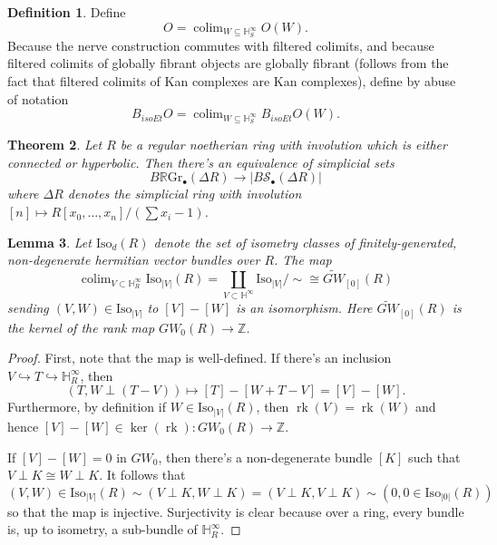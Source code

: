 \documentclass[draftthesis,tocnosub,noragright,centerchapter,10pt]{uiucthesis2009}
\newcommand{\Z}{\mathbb Z}
\newcommand{\mbb}{\mathbb}
\newcommand{\mc}{\mathcal}
\newcommand{\RGr}{\mathbb R\mathrm{Gr}}
\newcommand{\Iso}{\mathrm{Iso}}
\DeclareMathOperator*{\colim}{colim}
\DeclareMathOperator{\rk}{rk}
\theoremstyle{plain}
\newtheorem{lemma}{Lemma}
\newtheorem{theorem}[lemma]{Theorem}
\theoremstyle{definition}
\newtheorem{definition}[lemma]{Definition}
\begin{document}
\begin{definition}
Define
\[
O = \colim_{W \subseteq \mbb H^\infty_S} O(W).
\]
Because the nerve construction commutes with filtered colimits, and
because filtered colimits of globally fibrant objects are globally
fibrant (follows from the fact that filtered colimits of Kan complexes
are Kan complexes), define by abuse of notation
\[
B_{isoEt}O = \colim_{W \subseteq \mbb H^\infty_S} B_{isoEt}O(W).
\]
\end{definition}

\begin{theorem}
Let $R$ be a regular noetherian ring with involution which is either connected or
hyperbolic. Then there's an equivalence of simplicial sets
\[
B\RGr_\bullet(\Delta R) \rightarrow |B \mc S_\bullet (\Delta R)|
\]
where $\Delta R$ denotes the simplicial ring with involution $[n] \mapsto
R[x_0,\dots,x_n]/(\sum x_i -1)$. 
\end{theorem}


\begin{lemma}
Let $\Iso_d(R)$ denote the set of isometry classes of finitely-generated, non-degenerate
hermitian vector bundles over $R$. The map
\[
\colim_{V \subset \mbb H^\infty_R} \Iso_{|V|}(R) = \coprod_{V \subset
  \mbb H^\infty} \Iso_{|V|}/\sim \cong \widetilde{GW}_{[0]}(R)
\]
sending $(V,W) \in \Iso_{|V|}$ to $[V] - [W]$ is an isomorphism. 
Here $\widetilde{GW}_{[0]}(R)$ is the kernel of the rank map $GW_0(R)
\rightarrow \Z$.
\end{lemma}

\begin{proof}
First, note that the map is well-defined. If there's an inclusion $V
\hookrightarrow T \hookrightarrow \mbb H^\infty_R$, then 
\[
(T,W \perp (T-V)) \mapsto [T] - [W + T - V] = [V] - [W].
\]
Furthermore, by definition if $W \in \Iso_{|V|}(R)$, then $\rk(V) =
\rk(W)$ and hence $[V]-[W] \in \ker(\rk) : GW_0(R) \rightarrow \Z$. 

If $[V] - [W] = 0$ in $GW_0$, then there's a non-degenerate bundle
$[K]$ such that $V \perp K \cong W \perp K$. It follows that $(V,W) \in
\Iso_{|V|}(R) \sim (V \perp K, W \perp K) = (V \perp K, V \perp K)
\sim (0,0\in \Iso_{|0|}(R))$ so that the map is
injective. Surjectivity is clear because over a ring, every bundle is,
up to isometry, a sub-bundle of $\mbb H^\infty_R$.
\end{proof}
\end{document}
